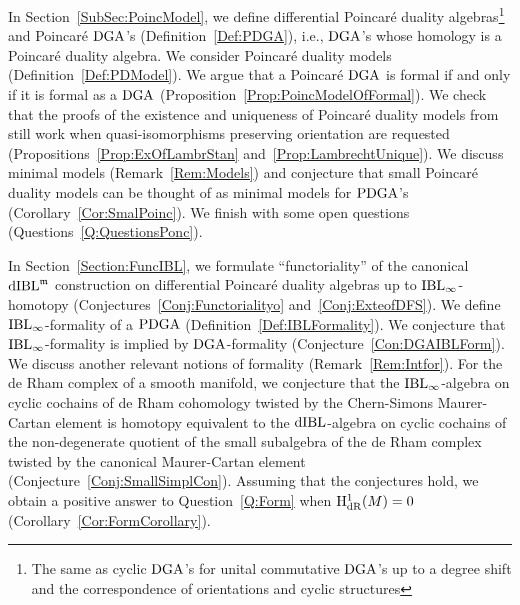 \documentclass[\MainFolder/Text.tex]{subfiles}
\begin{document}
In Section~\ref{SubSec:PoincModel}, we define differential Poincar\'e duality algebras\footnote{The same as cyclic $\mathrm{DGA}$'s for unital commutative $\mathrm{DGA}$'s up to a degree shift and the correspondence of orientations and cyclic structures} and Poincar\'e $\mathrm{DGA}$'s (Definition~\ref{Def:PDGA}), i.e., $\mathrm{DGA}$'s whose homology is a Poincar\'e duality algebra. We consider Poincar\'e duality models (Definition~\ref{Def:PDModel}). We argue that a Poincar\'e $\mathrm{DGA}$ is formal if and only if it is formal as a $\mathrm{DGA}$ (Proposition~\ref{Prop:PoincModelOfFormal}). We check that the proofs of the existence and uniqueness of Poincar\'e duality models from \cite{Lambrechts2007} still work when quasi-isomorphisms preserving orientation are requested (Propositions~\ref{Prop:ExOfLambrStan} and~\ref{Prop:LambrechtUnique}). We discuss minimal models (Remark~\ref{Rem:Models}) and conjecture that small Poincar\'e duality models can be thought of as minimal models for $\mathrm{PDGA}$'s (Corollary~\ref{Cor:SmalPoinc}). We finish with some open questions (Questions~\ref{Q:QuestionsPonc}).


In Section~\ref{Section:FuncIBL}, we formulate ``functoriality'' of the canonical $\mathrm{dIBL}^{\mathfrak{m}}$ construction on differential Poincar\'e duality algebras up to $\mathrm{IBL}_\infty$-homotopy (Conjectures~\ref{Conj:Functorialityo} and~\ref{Conj:ExteofDFS}). We define $\mathrm{IBL}_\infty$-formality of a $\mathrm{PDGA}$ (Definition~\ref{Def:IBLFormality}). We conjecture that $\mathrm{IBL}_\infty$-formality is implied by $\mathrm{DGA}$-formality (Conjecture~\ref{Con:DGAIBLForm}). We discuss another relevant notions of formality (Remark~\ref{Rem:Intfor}). For the de Rham complex of a smooth manifold, we conjecture that the $\mathrm{IBL}_\infty$-algebra on cyclic cochains of de Rham cohomology twisted by the Chern-Simons Maurer-Cartan element is homotopy equivalent to the $\mathrm{dIBL}$-algebra on cyclic cochains of the non-degenerate quotient of the small subalgebra of the de Rham complex twisted by the canonical Maurer-Cartan element (Conjecture~\ref{Conj:SmallSimplCon}). Assuming that the conjectures hold, we obtain a positive answer to Question~\ref{Q:Form} when $\mathrm{H}_{\mathrm{dR}}^1(M)=0$ (Corollary~\ref{Cor:FormCorollary}).
\end{document}

